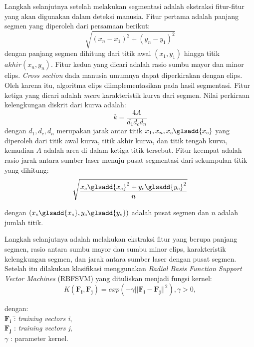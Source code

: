         Langkah selanjutnya setelah melakukan segmentasi adalah ekstraksi fitur-fitur yang akan digunakan dalam deteksi manusia. Fitur pertama adalah panjang segmen yang diperoleh dari persamaan berikut:
        \begin{equation}
            \sqrt{(x_n-x_1)^2+(y_n-y_1)^2}
        \end{equation} 
        dengan panjang segmen dihitung dari titik awal $(x_1,y_1)$ hingga titik $akhir (x_n,y_n)$. Fitur kedua yang dicari adalah rasio sumbu mayor dan minor elips. 
        \textit{Cross section} dada manusia umumnya dapat diperkirakan dengan elips. Oleh karena itu, algoritma elips diimplementasikan pada hasil segmentasi. Fitur ketiga yang dicari adalah \textit{mean} karakteristik kurva dari segmen. Nilai perkiraan kelengkungan diskrit dari kurva adalah\cite{c2b}:
        \begin{equation}
            k=\frac{4A}{d_1d_cd_n}
        \end{equation}
        dengan $d_1, d_c, d_n$ merupakan jarak antar titik $x_1, x_n, x_c\glsadd{x_c}$ yang diperoleh dari titik awal kurva, titik akhir kurva, dan titik tengah kurva, kemudian $A$ adalah area di dalam ketiga titik tersebut. 
        Fitur keempat adalah rasio jarak antara sumber laser menuju pusat segmentasi dari sekumpulan titik yang dihitung:
        \begin{equation}
            \sqrt{\frac{x_c\glsadd{x_c}^2+y_c\glsadd{y_c}^2}{n}}
        \end{equation} 
        
        dengan $(x_c\glsadd{x_c},y_c\glsadd{y_c})$ adalah pusat segmen dan $n$ adalah jumlah titik.

    Langkah selanjutnya adalah melakukan ekstraksi fitur yang berupa panjang segmen, rasio antara sumbu mayor dan sumbu minor elips, karakteristik kelengkungan segmen, dan jarak antara sumber laser dengan pusat segmen. Setelah itu dilakukan klasifikasi menggunakan \textit{Radial Basis Function Support Vector Machines} (RBFSVM) yang dituliskan menjadi fungsi kernel:
    \begin{equation}
        K(\mathbf{F_i,F_j})=exp(-\gamma||\mathbf{F_i}-\mathbf{F_j}||^2), \gamma >0,
    \end{equation}
    \begin{tabbing}
        dengan: \=\\
            \>$\mathbf{F_i}$ \qquad \=: \textit{training vectors i},\\ 
            \>$\mathbf{F_j}$ \>: \textit{training vectors j},\\
            \>$\gamma$ \>: parameter kernel.
    \end{tabbing}
    
